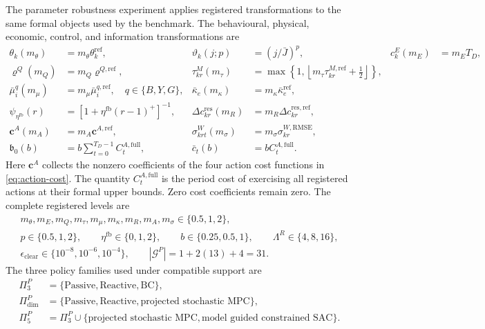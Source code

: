 \documentclass[a4paper,fleqn]{cas-sc}
\newcommand{\pos}[1]{\left(#1\right)^{+}}
\begin{document}
The parameter robustness experiment applies registered transformations to the
same formal objects used by the benchmark. The behavioural, physical,
economic, control, and information transformations are
\begin{subequations}\label{eq:robustness-transformations-51}
\begin{align}
 \theta_k(m_\theta)&=m_\theta\theta_k^{\mathrm{ref}},
 &\vartheta_k(j;p)&=\left(j/\bar J\right)^p,
 &c^E_k(m_E)&=m_ET_D,\\
 \varrho^Q(m_Q)&=m_Q\varrho^{Q,\mathrm{ref}},
 &\tau^M_{kr}(m_\tau)&=
 \max\!\left\{1,\left\lfloor
 m_\tau\tau^{M,\mathrm{ref}}_{kr}+\tfrac12
 \right\rfloor\right\},\\
 \bar\mu_i^q(m_\mu)&=m_\mu\bar\mu_i^{q,\mathrm{ref}},
 \quad q\in\{B,Y,G\},
 &\bar\kappa_e(m_\kappa)&=m_\kappa\bar\kappa_e^{\mathrm{ref}},\\
 \psi_{\eta^{\mathrm{fb}}}(r)&=
 \left[1+\eta^{\mathrm{fb}}\pos{r-1}\right]^{-1},
 &\Delta c^{\mathrm{res}}_{kr}(m_R)&=
 m_R\Delta c^{\mathrm{res,ref}}_{kr},\\
 \boldsymbol c^A(m_A)&=m_A\boldsymbol c^{A,\mathrm{ref}},
 &\sigma^W_{krt}(m_\sigma)&=
 m_\sigma\sigma^{W,\mathrm{RMSE}}_{kr},\\
 \mathfrak b_0(b)&=b\sum_{t=0}^{T_D-1}C_t^{A,\mathrm{full}},
 &\bar c_t(b)&=bC_t^{A,\mathrm{full}}.
\end{align}
\end{subequations}
Here $\boldsymbol c^A$ collects the nonzero coefficients of the four action
cost functions in \cref{eq:action-cost}. The quantity
$C_t^{A,\mathrm{full}}$ is the period cost of exercising all registered actions
at their formal upper bounds. Zero cost coefficients remain zero. The complete
registered levels are
\begin{equation}
 \begin{gathered}
 m_\theta,m_E,m_Q,m_\tau,m_\mu,m_\kappa,m_R,m_A,m_\sigma
 \in\{0.5,1,2\},\\
 p\in\{0.5,1,2\},\qquad
 \eta^{\mathrm{fb}}\in\{0,1,2\},\qquad
 b\in\{0.25,0.5,1\},\qquad
 \Lambda^R\in\{4,8,16\},\\
 \epsilon_{\mathrm{clear}}\in\{10^{-8},10^{-6},10^{-4}\},
 \qquad |\mathcal G^{P}|=1+2(13)+4=31.
 \end{gathered}
 \label{eq:robustness-design-51}
\end{equation}
The three policy families used under compatible support are
\begin{equation}
 \begin{aligned}
 \Pi^P_3&=\{\text{Passive},\text{Reactive},\text{BC}\},\\
 \Pi^P_{\mathrm{dim}}&=
 \{\text{Passive},\text{Reactive},\text{projected stochastic MPC}\},\\
 \Pi^P_5&=\Pi^P_3\cup
 \{\text{projected stochastic MPC},
 \text{model guided constrained SAC}\}.
 \end{aligned}
 \label{eq:robustness-policy-support-51}
\end{equation}
\end{document}
